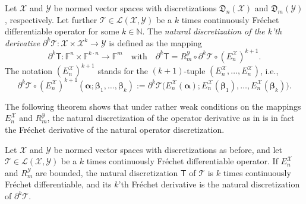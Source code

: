 \documentclass[a4paper]{paper}
\newcommand{\Discr}{\mathfrak{D}}
\newcommand{\Spc}[1]{\mathscr{#1}}
\newcommand{\Field}{\mathbb{F}}
\newcommand{\Natural}{\mathbb{N}}
\newcommand{\Op}[1]{\mathcal{#1}}
\newcommand{\DiscOp}[1]{\mathsf{#1}}
\newcommand*{\EXT}[2]{\ensuremath{E_{#1}^{#2}}}
\newcommand*{\REST}[2]{\ensuremath{R_{#1}^{#2}}}
\newcommand*{\RmY}{\ensuremath{\REST{m}{\Spc{Y}}}}
\newcommand*{\EnX}{\ensuremath{\EXT{n}{\Spc{X}}}}
\newcommand{\valpha}{\boldsymbol{\alpha}}
\newcommand{\vbeta}{\boldsymbol{\beta}}
\begin{document}
\begin{definition}
 \label{def:derivative_discretization}
 Let $\Spc{X}$ and $\Spc{Y}$ be normed vector spaces with discretizations $\Discr_n(\Spc{X})$ and $\Discr_m(\Spc{Y})$, 
 respectively. Let further $\Op{T} \in \Spc{L}(\Spc{X}, \Spc{Y})$ be a $k$ times continuously Fr\'{e}chet 
 differentiable operator for some $k \in  \Natural$. The \emph{natural discretization of the $k$'th derivative} 
 $\partial^k \Op{T} \colon \Spc{X} \times \Spc{X}^k \to \Spc{Y}$ is defined as the mapping
 \begin{equation*}
  \partial^k \DiscOp{T} \colon \Field^n \times \Field^{k\cdot n} \to \Field^m
  \quad \text{with} \quad
  \partial^k \DiscOp{T} = \RmY \circ \partial^k \Op{T} \circ (\EnX)^{k+1}.
 \end{equation*}
 The notation $(\EnX)^{k+1}$ stands for the $(k+1)$-tuple $(\EnX, \ldots, \EnX)$, i.e., 
 \begin{equation*}
  \partial^k \Op{T} \circ (\EnX)^{k+1}(\valpha; \vbeta_1, \ldots, \vbeta_k) :=
 \partial^k \Op{T}\big( \EnX(\valpha); \EnX(\vbeta_1), \ldots, \EnX(\vbeta_k) \big).
 \end{equation*}
\end{definition}


The following theorem shows that under rather weak conditions on the mappings $E_n^{\Spc{X}}$ and $R_m^{\Spc{Y}}$, the 
natural discretization of the operator derivative as in  is in fact the Fr\'{e}chet 
derivative of the natural operator discretization.

\begin{theorem}
 Let $\Spc{X}$ and $\Spc{Y}$ be normed vector spaces with discretizations as before, and let 
 $\Op{T} \in \Spc{L}(\Spc{X}, \Spc{Y})$ be a $k$ times continuously Fr\'{e}chet differentiable 
 operator. If $E_n^{\Spc{X}}$ and $R_m^{\Spc{Y}}$ are bounded, the natural discretization $\DiscOp{T}$ of $\Op{T}$ is 
 $k$ times  continuously Fr\'{e}chet differentiable, and its $k$'th Fr\'{e}chet derivative is the natural 
 discretization of $\partial^k\Op{T}$.
\end{theorem}
\end{document}
